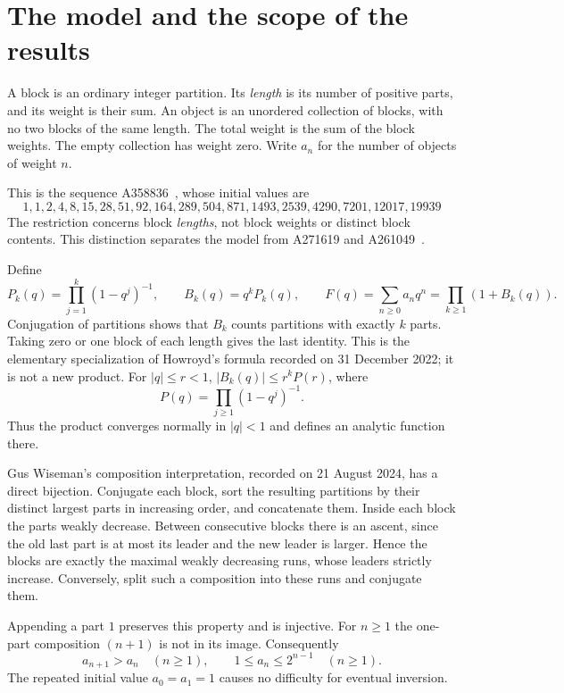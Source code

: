 \documentclass[11pt]{article}
\theoremstyle{remark}\newtheorem{remark}[theorem]{Remark}
\begin{document}
\section{The model and the scope of the results}\label{stp:len:sec:model}
A block is an ordinary integer partition. Its \emph{length} is its number of positive parts, and its weight is their sum. An object is an unordered collection of blocks, with no two blocks of the same length. The total weight is the sum of the block weights. The empty collection has weight zero. Write $a_n$ for the number of objects of weight $n$.

This is the sequence A358836~\cite{oeisA358836}, whose initial values are
\[
1,1,2,4,8,15,28,51,92,164,289,504,871,1493,2539,4290,7201,12017,19939
\]
The restriction concerns block \emph{lengths}, not block weights or distinct block contents. This distinction separates the model from A271619 and A261049~\cite{neighbor}.

Define
\begin{equation}\label{stp:len:eq:products}
 P_k(q)=\prod_{j=1}^k(1-q^j)^{-1},\qquad B_k(q)=q^kP_k(q),\qquad
 F(q)=\sum_{n\ge0}a_nq^n=\prod_{k\ge1}(1+B_k(q)).
\end{equation}
Conjugation of partitions shows that $B_k$ counts partitions with exactly $k$ parts. Taking zero or one block of each length gives the last identity. This is the elementary specialization of Howroyd's formula recorded on 31 December 2022; it is not a new product. For $|q|\le r<1$, $|B_k(q)|\le r^kP(r)$, where
\[
 P(q)=\prod_{j\ge1}(1-q^j)^{-1}.
\]
Thus the product converges normally in $|q|<1$ and defines an analytic function there.

Gus Wiseman's composition interpretation, recorded on 21 August 2024, has a direct bijection. Conjugate each block, sort the resulting partitions by their distinct largest parts in increasing order, and concatenate them. Inside each block the parts weakly decrease. Between consecutive blocks there is an ascent, since the old last part is at most its leader and the new leader is larger. Hence the blocks are exactly the maximal weakly decreasing runs, whose leaders strictly increase. Conversely, split such a composition into these runs and conjugate them.

Appending a part $1$ preserves this property and is injective. For $n\ge1$ the one-part composition $(n+1)$ is not in its image. Consequently
\begin{equation}\label{stp:len:eq:monotone}
 a_{n+1}>a_n\quad(n\ge1),\qquad 1\le a_n\le2^{n-1}\quad(n\ge1).
\end{equation}
The repeated initial value $a_0=a_1=1$ causes no difficulty for eventual inversion.
\end{document}
